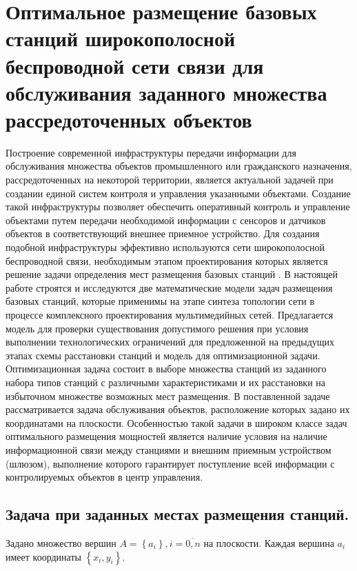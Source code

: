 \chapter{Оптимальное размещение базовых станций широкополосной беспроводной сети
связи для обслуживания заданного множества рассредоточенных объектов}\label{ch:ch2}

Построение современной инфраструктуры передачи информации для обслуживания множества объектов промышленного или гражданского назначения, рассредоточенных на некоторой территории, является актуальной задачей при создании единой систем контроля и управления указанными объектами.  Создание такой инфраструктуры позволяет обеспечить оперативный контроль и управление объектами путем передачи необходимой информации с сенсоров и датчиков объектов в соответствующий внешнее приемное устройство. Для создания подобной инфраструктуры эффективно используются сети широкополосной беспроводной связи, необходимым этапом проектирования которых является решение задачи определения мест размещения базовых станций \cite{VishnevskyBook}.
В настоящей работе строятся и исследуются две математические модели задач размещения базовых станций, которые применимы на этапе синтеза топологии сети в процессе комплексного проектирования мультимедийных сетей. Предлагается модель для проверки существования допустимого решения при условия выполнении технологических ограничений для предложенной на предыдущих этапах схемы расстановки станций и модель для оптимизационной задачи. Оптимизационная задача состоит в выборе множества станций из заданного набора типов станций с различными характеристиками и их расстановки на избыточном множестве возможных мест размещения. В поставленной задаче рассматривается задача обслуживания объектов, расположение которых задано их координатами на плоскости. Особенностью такой задачи в широком классе задач оптимального размещения мощностей является наличие условия на наличие информационной связи между станциями и внешним приемным устройством (шлюзом), выполнение которого гарантирует поступление всей информации с контролируемых объектов в центр управления.

\section{Задача при заданных местах размещения станций.}

Задано множество вершин $A= \left\{ a_i \right\}, i=\overline{0,n}$ на плоскости. Каждая вершина $a_i$ имеет координаты $\left\{ x_i, y_i \right\}$.

